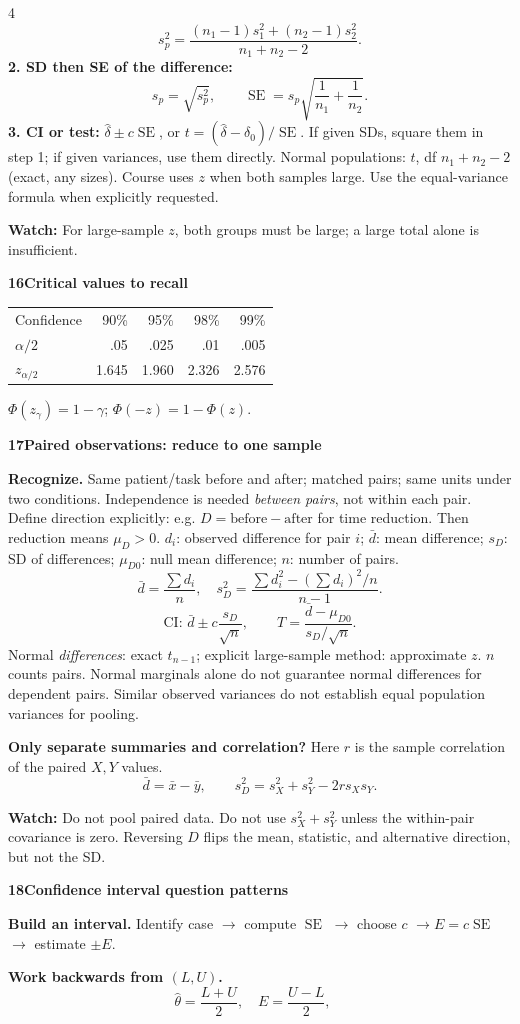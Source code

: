 \documentclass[a4paper,landscape]{article}
\newcommand{\head}[2][late]{\par\vspace{3pt}\noindent\colorbox{#1}{\parbox{\dimexpr\linewidth-6pt}{\color{white}\bfseries #2}}\par\vspace{1pt}}
\newcommand{\cue}[1]{\par\textbf{#1}\enspace}
\newcommand{\trap}[1]{\par{\color{alert}\textbf{Watch:} #1}}
\newcommand{\SE}{\operatorname{SE}}
\newcommand{\xb}{\bar x}
\newcommand{\db}{\bar d}
\newcommand{\col}{\par\vfill\columnbreak}
\begin{document}
\begin{multicols*}{4}
\[s_p^2=\frac{(n_1-1)s_1^2+(n_2-1)s_2^2}{n_1+n_2-2}.\]
\textbf{2. SD then SE of the difference:}
\[s_p=\sqrt{s_p^2},\qquad
 \SE=s_p\sqrt{\frac1{n_1}+\frac1{n_2}}.\]
\textbf{3. CI or test:} \(\hat\delta\pm c\SE\), or \(t=(\hat\delta-\delta_0)/\SE\). If given SDs, square them in step 1; if given variances, use them directly.
Normal populations: \(t\), df \(n_1+n_2-2\) (exact, any sizes). Course uses \(z\) when both samples large. Use the equal-variance formula when explicitly requested.
\trap{For large-sample \(z\), both groups must be large; a large total alone is insufficient.}
\head{16\quad Critical values to recall}
\begin{tabular}{@{}lrrrr@{}}
Confidence &90\%&95\%&98\%&99\%\\
\(\alpha/2\)&.05&.025&.01&.005\\
\(z_{\alpha/2}\)&1.645&1.960&2.326&2.576
\end{tabular}\par
\(\Phi(z_\gamma)=1-\gamma\); \(\Phi(-z)=1-\Phi(z)\).
\col
\head{17\quad Paired observations: reduce to one sample}
\cue{Recognize.} Same patient/task before and after; matched pairs; same units under two conditions. Independence is needed \emph{between pairs}, not within each pair.
Define direction explicitly: e.g. \(D=\text{before}-\text{after}\) for time reduction. Then reduction means \(\mu_D>0\).
\(d_i\): observed difference for pair \(i\); \(\db\): mean difference; \(s_D\): SD of differences; \(\mu_{D0}\): null mean difference; \(n\): number of pairs.
\[\db=\frac{\sum d_i}{n},\quad
 s_D^2=\frac{\sum d_i^2-(\sum d_i)^2/n}{n-1}.\]
\[\text{CI: }\db\pm c\frac{s_D}{\sqrt n},\qquad
 T=\frac{\db-\mu_{D0}}{s_D/\sqrt n}.\]
Normal \emph{differences}: exact \(t_{n-1}\); explicit large-sample method: approximate \(z\). \(n\) counts pairs. Normal marginals alone do not guarantee normal differences for dependent pairs. Similar observed variances do not establish equal population variances for pooling.
\cue{Only separate summaries and correlation?}
Here \(r\) is the sample correlation of the paired \(X,Y\) values.
\[\db=\xb-\bar y,\qquad s_D^2=s_X^2+s_Y^2-2rs_Xs_Y.\]
\trap{Do not pool paired data. Do not use \(s_X^2+s_Y^2\) unless the within-pair covariance is zero. Reversing \(D\) flips the mean, statistic, and alternative direction, but not the SD.}
\head{18\quad Confidence interval question patterns}
\cue{Build an interval.} Identify case \(\to\) compute \(\SE\) \(\to\) choose \(c\) \(\to E=c\SE\) \(\to\) estimate \(\pm E\).
\cue{Work backwards from \((L,U)\).}
\[\hat\theta=\frac{L+U}{2},\quad E=\frac{U-L}{2},\quad
\]
\end{multicols*}
\end{document}

